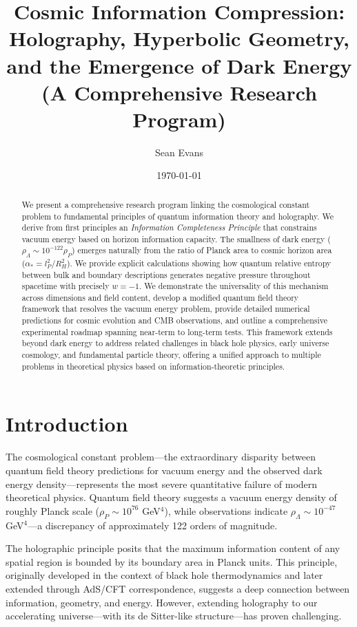 \documentclass[12pt]{article}
\title{Cosmic Information Compression:\\
Holography, Hyperbolic Geometry, and the Emergence of Dark Energy\\
(A Comprehensive Research Program)}
\author{Sean Evans}
\date{\today}
\theoremstyle{plain}
\theoremstyle{definition}
\theoremstyle{remark}
\begin{document}
\maketitle

\begin{abstract}
We present a comprehensive research program linking the cosmological constant problem to fundamental principles of quantum information theory and holography. We derive from first principles an \textit{Information Completeness Principle} that constrains vacuum energy based on horizon information capacity. The smallness of dark energy ($\rho_\Lambda \sim 10^{-122}\rho_P$) emerges naturally from the ratio of Planck area to cosmic horizon area ($\alpha_* = l_P^2/R_H^2$). We provide explicit calculations showing how quantum relative entropy between bulk and boundary descriptions generates negative pressure throughout spacetime with precisely $w = -1$. We demonstrate the universality of this mechanism across dimensions and field content, develop a modified quantum field theory framework that resolves the vacuum energy problem, provide detailed numerical predictions for cosmic evolution and CMB observations, and outline a comprehensive experimental roadmap spanning near-term to long-term tests. This framework extends beyond dark energy to address related challenges in black hole physics, early universe cosmology, and fundamental particle theory, offering a unified approach to multiple problems in theoretical physics based on information-theoretic principles.
\end{abstract}

\section{Introduction}

The cosmological constant problem—the extraordinary disparity between quantum field theory predictions for vacuum energy and the observed dark energy density—represents the most severe quantitative failure of modern theoretical physics. Quantum field theory suggests a vacuum energy density of roughly Planck scale ($\rho_P \sim 10^{76}$ GeV$^4$), while observations indicate $\rho_\Lambda \sim 10^{-47}$ GeV$^4$—a discrepancy of approximately 122 orders of magnitude.

The holographic principle posits that the maximum information content of any spatial region is bounded by its boundary area in Planck units. This principle, originally developed in the context of black hole thermodynamics and later extended through AdS/CFT correspondence, suggests a deep connection between information, geometry, and energy. However, extending holography to our accelerating universe—with its de Sitter-like structure—has proven challenging.
\end{document}
